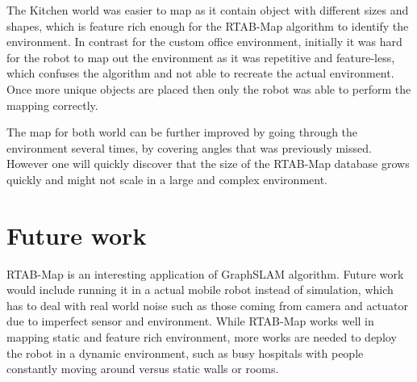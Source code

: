 \documentclass[10pt,journal,compsoc]{IEEEtran}
\begin{document}
The Kitchen world was easier to map as it contain object with different sizes and shapes, which is feature rich enough for the RTAB-Map algorithm to identify the environment.  In contrast for the custom office environment, initially it was hard for the robot to map out the environment as it was repetitive and feature-less, which confuses the algorithm and not able to recreate the actual environment.  Once more unique objects are placed then only the robot was able to perform the mapping correctly.  

The map for both world can be further improved by going through the environment several times, by covering angles that was previously missed.  However one will quickly discover that the size of the RTAB-Map database grows quickly and might not scale in a large and complex environment.

\section{Future work}

RTAB-Map is an interesting application of GraphSLAM algorithm.  Future work would include running it in a actual mobile robot instead of simulation, which has to deal with real world noise such as those coming from camera and actuator due to imperfect sensor and environment.  While RTAB-Map works well in mapping static and feature rich environment, more works are needed to deploy the robot in a dynamic environment, such as busy hospitals with people constantly moving around versus static walls or rooms.










\end{document}
